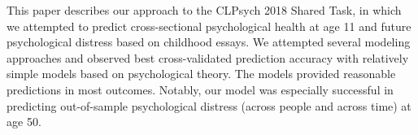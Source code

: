 This paper describes our approach to the CLPsych 2018 Shared Task, in which we attempted to predict cross-sectional psychological health at age 11 and future psychological distress based on childhood essays. We attempted several modeling approaches and observed best cross-validated prediction accuracy with relatively simple models based on psychological theory. The models provided reasonable predictions in most outcomes. Notably, our model was especially successful in predicting out-of-sample psychological distress (across people and across time) at age 50.
